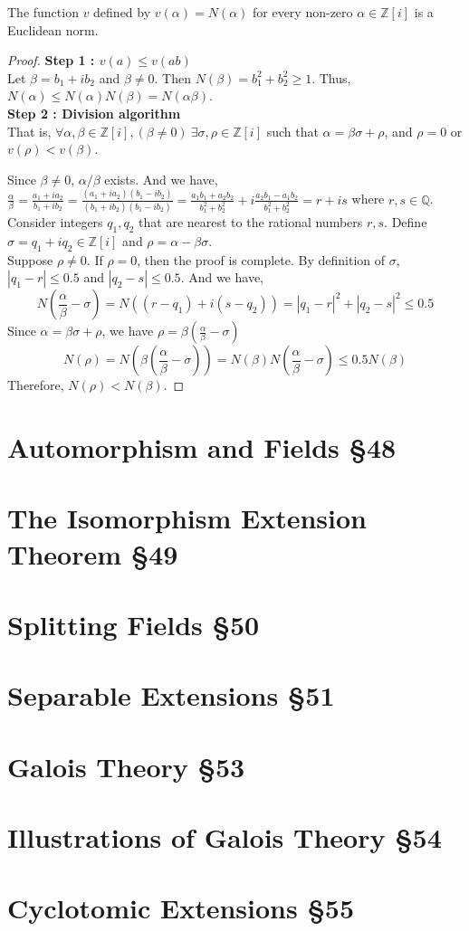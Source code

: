 \begin{theorem}
	The function $v$ defined by $v(\alpha) = N(\alpha)$ for every non-zero $\alpha \in \mathbb{Z}[i]$ is a Euclidean norm.
\end{theorem}
\begin{proof}
	\textbf{Step 1 : $v(a) \le v(ab)$}\\
	Let $\beta = b_1 + ib_2$ and $\beta \ne 0$.
	Then $N(\beta) = b_1^2+b_2^2 \ge 1$.
	Thus, $N(\alpha) \le N(\alpha)N(\beta) = N(\alpha\beta)$.\\

	\textbf{Step 2 : Division algorithm}\\
	That is, $\forall \alpha,\beta \in \mathbb{Z}[i],(\beta \ne 0)\ \exists \sigma,\rho \in \mathbb{Z}[i]$ such that $\alpha = \beta\sigma+\rho$, and $\rho = 0$ or $v(\rho) < v(\beta)$.

	Since $\beta \ne 0$, $\alpha/\beta$ exists.
	And we have, $\frac{\alpha}{\beta} = \frac{a_1+ia_2}{b_1+ib_2} = \frac{(a_1+ia_2)(b_1-ib_2)}{(b_1+ib_2)(b_1-ib_2)} = \frac{a_1b_1+a_2b_2}{b_1^2+b_2^2} + i \frac{a_2b_1-a_1b_2}{b_1^2+b_2^2} = r+is$ where $r,s \in \mathbb{Q}$.
	Consider integers $q_1,q_2$ that are nearest to the rational numbers $r,s$.
	Define $\sigma = q_1 + iq_2 \in \mathbb{Z}[i]$ and $\rho = \alpha - \beta\sigma$.\\

	Suppose $\rho \ne 0$.
	If $\rho = 0$, then the proof is complete.
	By definition of $\sigma$, $|q_1-r| \le 0.5$ and $|q_2-s| \le 0.5$.
	And we have, $$N \left(\frac{\alpha}{\beta} - \sigma \right) = N((r-q_1)+i(s-q_2)) = |q_1-r|^2 + |q_2-s|^2 \le 0.5$$
	Since $\alpha = \beta\sigma + \rho$,
	we have $\rho = \beta(\frac{\alpha}{\beta}-\sigma)$
	$$N(\rho) = N \left( \beta \left(\frac{\alpha}{\beta}-\sigma \right) \right) = N(\beta) N \left(\frac{\alpha}{\beta}-\sigma\right) \le 0.5N(\beta)$$
	Therefore, $N(\rho) < N(\beta)$.
\end{proof}
\section{Automorphism and Fields \S48}
\section{The Isomorphism Extension Theorem \S49}
\section{Splitting Fields \S50}

\section{Separable Extensions \S51}
\section{Galois Theory \S53}
\section{Illustrations of Galois Theory \S54}
\section{Cyclotomic Extensions \S55}
